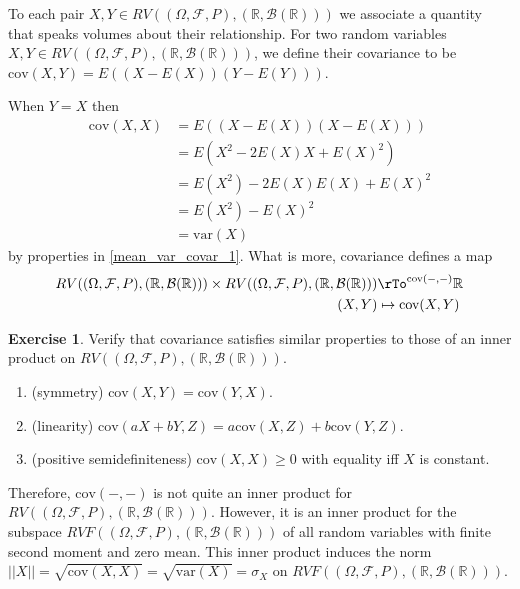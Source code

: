 \documentclass[12pt]{amsart}
\theoremstyle{definition}
\newtheorem{exercise}[theorem]{Exercise}
\begin{document}
To each pair $X, Y \in RV((\Omega, \mathcal{F}, P), (\mathbb{R}, \mathcal{B}(\mathbb{R})))$ we associate a quantity that speaks volumes about their relationship.
\dfn For  two random variables $X, Y \in RV((\Omega, \mathcal{F}, P), (\mathbb{R}, \mathcal{B}(\mathbb{R})))$, we define their covariance to be $\text{cov}(X, Y) = E((X-E(X))(Y-E(Y)))$.

When $Y = X$ then
\begin{align*}
\text{cov}(X, X) & = E((X - E(X))(X - E(X))) \\
 & = E(X^2 - 2E(X)X + E(X)^2) \\
 & = E(X^2) - 2E(X)E(X) + E(X)^2 \\
 & = E(X^2) - E(X)^2 \\
 & = \text{var}(X)
\end{align*}
by properties in \ref{mean_var_covar_1}. What is more, covariance defines a map
\begin{align*}
RV((\Omega, \mathcal{F}, P), (\mathbb{R}, \mathcal{B}(\mathbb{R}))) \times RV((\Omega, \mathcal{F}, P), (\mathbb{R}, \mathcal{B}(\mathbb{R}))) & \rTo^{\text{cov}(-,-)} \mathbb{R} \\
(X, Y) & \mapsto \text{cov}(X, Y)
\end{align*}

\begin{exercise} \label{innerproductcovar} Verify that covariance satisfies similar properties to those of an inner product on $RV((\Omega, \mathcal{F}, P), (\mathbb{R}, \mathcal{B}(\mathbb{R})))$.
\begin{enumerate}[1.]
\item (symmetry) $\text{cov}(X, Y) = \text{cov}(Y, X)$.
\item (linearity) $\text{cov}(aX + bY, Z) = a \text{cov}(X,Z) + b \text{cov}(Y,Z)$.
\item (positive semidefiniteness) $\text{cov}(X, X) \geq 0$ with equality iff $X$ is constant.
\end{enumerate}
\end{exercise}

Therefore, $\text{cov}(-,-)$ is not quite an inner product for $RV((\Omega, \mathcal{F}, P), (\mathbb{R}, \mathcal{B}(\mathbb{R})))$. However, it is an inner product for the subspace $RVF((\Omega, \mathcal{F}, P), (\mathbb{R}, \mathcal{B}(\mathbb{R})))$ of all random variables with finite second moment and zero mean. This inner product induces the norm $||X|| = \sqrt{\text{cov}(X, X)} = \sqrt{\text{var}(X)} = \sigma_X$ on $RVF((\Omega, \mathcal{F}, P), (\mathbb{R}, \mathcal{B}(\mathbb{R})))$.
\end{document}
